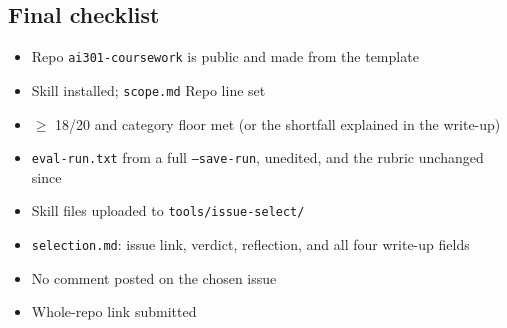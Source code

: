 \documentclass[11pt]{article}
\begin{document}
\subsection*{Final checklist}
\begin{itemize}[label=$\square$]
  \item Repo \texttt{ai301-coursework} is public and made from the template
  \item Skill installed; \texttt{scope.md} Repo line set
  \item $\geq$ 18/20 and category floor met (or the shortfall explained in the write-up)
  \item \texttt{eval-run.txt} from a full \texttt{--save-run}, unedited, and the rubric unchanged since
  \item Skill files uploaded to \texttt{tools/issue-select/}
  \item \texttt{selection.md}: issue link, verdict, reflection, and all four write-up fields
  \item No comment posted on the chosen issue
  \item Whole-repo link submitted
\end{itemize}
\end{document}
